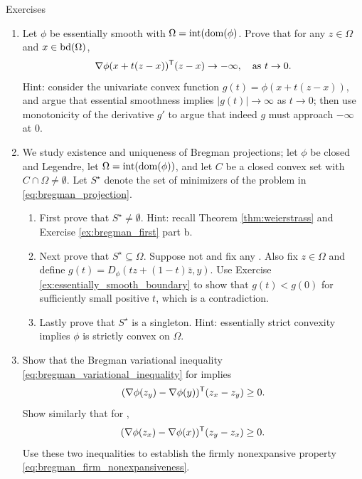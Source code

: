 \begin{xcb}{Exercises}
\begin{enumerate}[label=\thechapter.\arabic*]
\item \label{ex:essentially_smooth_boundary}
  Let $\phi$ be essentially smooth with $\Omega = \operatorname{int}(\operatorname{dom}(\phi)$. Prove
  that for any $z \in \Omega$ and $x \in \operatorname{bd}(\Omega)$, 
  \[
  \nabla\phi(x + t(z-x))^{\mathsf{T}} (z-x) \to -\infty, \quad \text{as $t \to 0$}.
  \]
  Hint: consider the univariate convex function $g(t) = \phi(x+t(z-x))$, and
  argue that essential smoothness implies $|g(t)| \to \infty$ as $t \to
  0$; then use monotonicity of the derivative $g'$ to argue that indeed $g$ must  
  approach $-\infty$ at 0.  

\item \label{ex:bregman_projection}
  We study existence and uniqueness of Bregman projections; let $\phi$ be closed 
  and Legendre, let $\Omega = \operatorname{int}(\operatorname{dom}(\phi))$, and let $C$ be a closed
  convex set with $C \cap \Omega \not= \emptyset$. Let $S^\star$ denote the set
  of minimizers of the problem in \eqref{eq:bregman_projection}. 

\begin{enumerate}[label=\alph*.]
\item First prove that $S^\star \not= \emptyset$. Hint: recall Theorem
  \ref{thm:weierstrass} and Exercise \ref{ex:bregman_first} part b. 

\item Next prove that $S^\star \subseteq \Omega$. Suppose not and fix any 
  . Also fix $z \in \Omega$ and
  define $g(t) = D_\phi(tz + (1-t)\bar{z}, y)$. Use Exercise 
  \ref{ex:essentially_smooth_boundary} to show that $g(t) < g(0)$ for
  sufficiently small positive $t$, which is a contradiction. 

\item Lastly prove that $S^\star$ is a singleton. Hint: essentially strict
  convexity implies $\phi$ is strictly convex on $\Omega$. 
\end{enumerate}

\item \label{ex:bregman_firm_nonexpansiveness}
  Show that the Bregman variational inequality
  \eqref{eq:bregman_variational_inequality} for 
  implies  
  \[
  (\nabla\phi(z_y) - \nabla\phi(y))^{\mathsf{T}} (z_x - z_y) \geq 0.
  \]
  Show similarly that for ,
  \[
  (\nabla\phi(z_x) - \nabla\phi(x))^{\mathsf{T}} (z_y - z_x) \geq 0.
  \]
  Use these two inequalities to establish the firmly nonexpansive property
  \eqref{eq:bregman_firm_nonexpansiveness}. 


\end{enumerate}
\end{xcb}

